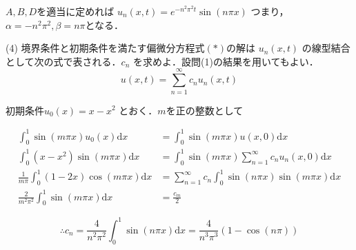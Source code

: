 \documentclass[a4j]{jarticle}
\begin{document}
$A,B,D$を適当に定めれば $u_n(x,t) = e^{-n^2\pi^2 t} \sin(n \pi x)$ つまり，$\alpha = -n^2\pi^2, \beta = n \pi$となる．

\begin{screen}
 (4) 境界条件と初期条件を満たす偏微分方程式$(\ast)$の解は $u_n(x,t)$ の線型結合として次の式で表される．$c_n$ を求めよ．設問(1)の結果を用いてもよい．
 $$u(x,t) = \sum_{n=1}^\infty c_n u_n (x,t)$$
\end{screen}

初期条件$u_0 (x) = x-x^2$ とおく．$m$を正の整数として

\begin{align*}
 \int_0^1 \sin(m \pi x)u_0(x) \mathrm{d} x&=  \int_0^1 \sin(m \pi x)u(x,0) \mathrm{d} x \\
 \int_0^1 (x-x^2)\sin(m \pi x) \mathrm{d} x&=  \int_0^1 \sin(m \pi x)\sum_{n=1}^\infty c_n u_n(x,0) \mathrm{d} x \\
 \frac{1}{m\pi} \int_0^1(1-2x)\cos(m \pi x) \mathrm{d}x &= \sum_{n=1}^\infty c_n \int_0^1 \sin(n \pi x) \sin( m \pi x) \mathrm{d} x \\
 \frac{2}{m^2\pi^2}\int_0^1 \sin(m \pi x)\mathrm{d}x&= \frac{c_m}{2}
\end{align*}

$$ \therefore c_n = \frac{4}{n^2\pi^2}\int_0^1 \sin(n \pi x)\mathrm{d}x = \frac{4}{n^3\pi^3}(1-\cos(n \pi))$$
\end{document}
